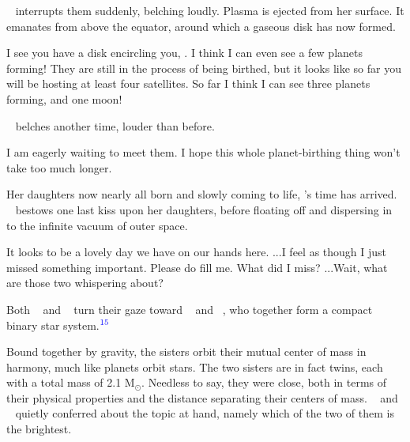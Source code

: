 \documentclass[main.tex]{subfiles}
\begin{document}
\par \nar \rmelectra~ interrupts them suddenly, belching loudly.  Plasma is ejected from her surface.  It emanates from above the equator, around which a gaseous disk has now formed.  

\par \Maia I see you have a disk encircling you, \rmelectra.  I think I can even see a few planets forming!  They are still in the process of being birthed, but it looks like so far you will be hosting at least four satellites.  So far I think I can see three planets forming, and one moon!

\par \nar \rmelectra~ belches another time, louder than before.

\par \Electra I am eagerly waiting to meet them.  I hope this whole planet-birthing thing won't take too much longer.


\par \nar Her daughters now nearly all born and slowly coming to life, \rmpleione's time has arrived. \rmpleione~ bestows one last kiss upon her daughters, before floating off and dispersing in to the infinite vacuum of outer space.

\par \Electra It looks to be a lovely day we have on our hands here. ...I feel as though I just missed something important.  Please do fill me.  What did I miss?  ...Wait, what are those two whispering about?

\par \nar Both \rmmaia~ and \rmelectra~ turn their gaze toward \rmtaygete~ and \rmalcyone~, who together form a compact binary star system.$^{\textcolor{blue}{15}}$

\par \nar Bound together by gravity, the sisters orbit their mutual center of mass in harmony, much like planets orbit stars.  The two sisters are in fact twins, each with a total mass of 2.1 M$_{\odot}$.  Needless to say, they were close, both in terms of their physical properties and the distance separating their centers of mass.  \rmtaygete~ and \rmalcyone~ quietly conferred about the topic at hand, namely which of the two of them is the brightest.
\end{document}
